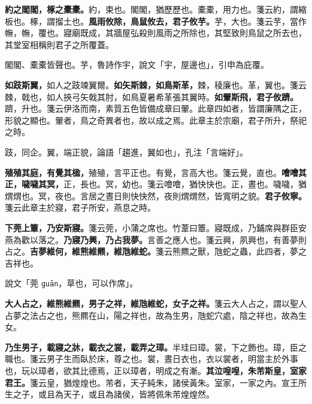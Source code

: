 \textbf{約之閣閣，椓之橐橐。}{\footnotesize 約，束也。閣閣，猶歷歷也。橐橐，用力也。箋云約，謂縮板也。椓，謂㨨土也。}\textbf{風雨攸除，鳥鼠攸去，君子攸芋。}{\footnotesize 芋，大也。箋云芋，當作幠，幠，覆也。寢廟既成，其牆屋弘殺則風雨之所除也，其堅致則鳥鼠之所去也，其堂室相稱則君子之所覆蓋。}

\begin{quoting}閣閣、橐橐皆聲也。芋，魯詩作宇，說文「宇，屋邊也」，引申為庇覆。\end{quoting}

\textbf{如跂斯翼，}{\footnotesize 如人之跂竦翼爾。}\textbf{如矢斯棘，如鳥斯革，}{\footnotesize 棘，稜廉也。革，翼也。箋云棘，戟也，如人挾弓矢戟其肘，如鳥夏暑希革張其翼時。}\textbf{如翬斯飛，君子攸躋。}{\footnotesize 躋，升也。箋云伊洛而南，素質五色皆備成章曰翬。此章四如者，皆謂廉隅之正，形貌之顯也。翬者，鳥之奇異者也，故以成之焉。此章主於宗廟，君子所升，祭祀之時。}

\begin{quoting}跂，同企。翼，端正貌，論語「趨進，翼如也」，孔注「言端好」。\end{quoting}

\textbf{殖殖其庭，有覺其楹，}{\footnotesize 殖殖，言平正也。有覺，言高大也。箋云覺，直也。}\textbf{噲噲其正，噦噦其冥，}{\footnotesize 正，長也。冥，幼也。箋云噲噲，猶快快也。正，晝也。噦噦，猶煟煟也。冥，夜也。言居之晝日則快快然，夜則煟煟然，皆寬明之貌。}\textbf{君子攸寧。}{\footnotesize 箋云此章主於寢，君子所安，燕息之時。}

\textbf{下莞上簟，乃安斯寢。}{\footnotesize 箋云莞，小蒲之席也。竹葦曰簟。寢既成，乃鋪席與群臣安燕為歡以落之。}\textbf{乃寢乃興，乃占我夢。}{\footnotesize 言善之應人也。箋云興，夙興也，有善夢則占之。}\textbf{吉夢維何，維熊維羆，維虺維蛇。}{\footnotesize 箋云熊羆之獸，虺蛇之蟲，此四者，夢之吉祥也。}

\begin{quoting}說文「莞 \texttt{ɡuān}，草也，可以作席」。\end{quoting}

\textbf{大人占之，維熊維羆，男子之祥，維虺維蛇，女子之祥。}{\footnotesize 箋云大人占之，謂以聖人占夢之法占之也，熊羆在山，陽之祥也，故為生男，虺蛇穴處，陰之祥也，故為生女。}

\textbf{乃生男子，載寢之牀，載衣之裳，載弄之璋。}{\footnotesize 半珪曰璋。裳，下之飾也。璋，臣之職也。箋云男子生而臥於床，尊之也。裳，晝日衣也，衣以裳者，明當主於外事也，玩以璋者，欲其比德焉，正以璋者，明成之有漸。}\textbf{其泣喤喤，朱芾斯皇，室家君王。}{\footnotesize 箋云皇，猶煌煌也。芾者，天子純朱，諸侯黃朱。室家，一家之內。宣王所生之子，或且為天子，或且為諸侯，皆將佩朱芾煌煌然。}

